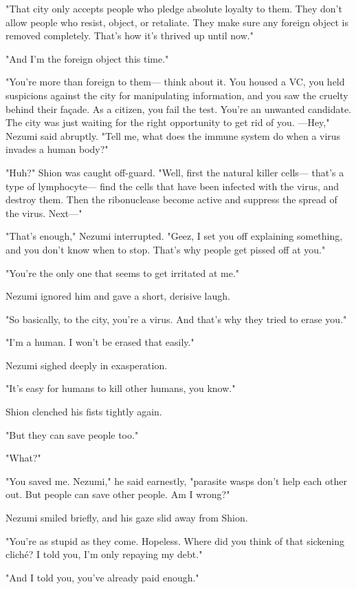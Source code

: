 "That city only accepts people who pledge absolute loyalty to them. They
don't allow people who resist, object, or retaliate. They make sure any
foreign object is removed completely. That's how it's thrived up until
now."

"And I'm the foreign object this time."

"You're more than foreign to them--- think about it. You housed a VC, you
held suspicions against the city for manipulating information, and you
saw the cruelty behind their fa\c{c}ade. As a citizen, you fail the test.
You're an unwanted candidate. The city was just waiting for the right
opportunity to get rid of you. ---Hey," Nezumi said abruptly. "Tell me,
what does the immune system do when a virus invades a human body?"

"Huh?" Shion was caught off-guard. "Well, first the natural killer
cells--- that's a type of lymphocyte--- find the cells that have been
infected with the virus, and destroy them. Then the ribonuclease become
active and suppress the spread of the virus. Next---"

"That's enough," Nezumi interrupted. "Geez, I set you off explaining
something, and you don't know when to stop. That's why people get pissed
off at you."

"You're the only one that seems to get irritated at me."

Nezumi ignored him and gave a short, derisive laugh.

"So basically, to the city, you're a virus. And that's why they tried to
erase you."

"I'm a human. I won't be erased that easily."

Nezumi sighed deeply in exasperation.

"It's easy for humans to kill other humans, you know."

Shion clenched his fists tightly again.

"But they can save people too."

"What?"

"You saved me. Nezumi," he said earnestly, "parasite wasps don't help
each other out. But people can save other people. Am I wrong?"

Nezumi smiled briefly, and his gaze slid away from Shion.

"You're as stupid as they come. Hopeless. Where did you think of that
sickening cliché? I told you, I'm only repaying my debt."

"And I told you, you've already paid enough."

